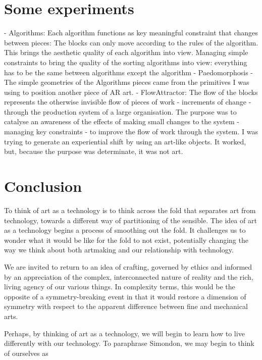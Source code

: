 \documentclass[letterpaper]{article}
\begin{document}
\section{Some experiments}

    - Algorithms: Each algorithm functions as key meaningful constraint that changes between pieces: The blocks can only move according to the rules of the algorithm. This brings the aesthetic quality of each algorithm into view. Managing simple constraints to bring the quality of the sorting algorithms into view: everything has to be the same between algorithms except the algorithm
    - Paedomorphosis - The simple geometries of the Algorithms pieces came from the primitives I was using to position another piece of AR art.
    - FlowAttractor: The flow of the blocks represents the otherwise invisible flow of pieces of work - increments of change - through the production system of a large organisation. The purpose was to catalyse an awareness of the effects of making small changes to the system - managing key constraints - to improve the flow of work through the system. I was trying to generate an experiential shift by using an art-like objects. It worked, but, because the purpose was determinate, it was not art.

\section{Conclusion}

    To think of art as a technology is to think across the fold that separates art from technology, towards a different way of partitioning of the sensible. The idea of art as a technology begins a process of smoothing out the fold. It challenges us to wonder what it would be like for the fold to not exist, potentially changing the way we think about both artmaking and our relationship with technology.
    
    We are invited to return to an idea of crafting, governed by ethics and informed by an appreciation of the complex, interconnected nature of reality and the rich, living agency of our various things. In complexity terms, this would be the opposite of a symmetry-breaking event in that it would restore a dimension of symmetry with respect to the apparent difference between fine and mechanical arts.
        
    Perhaps, by thinking of art as a technology, we will begin to learn how to live differently with our technology. To paraphrase Simondon, we may begin to think of ourselves as
    
\end{document}
